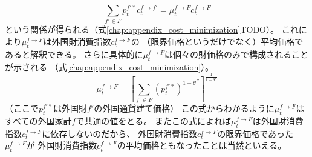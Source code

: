 \begin{equation}
\label{form:chapter3_households_stage1a_foreign_c_f_F_problem_mu_f_F_average_eq}
    \sum_{f'\in F}p_t^{f'*}c_t^{f\to f'}=\mu_t^{f\to F}c_t^{f\to F}
\end{equation}
という関係が得られる（式\eqref{chap:appendix_cost_minimization}TODO）。
これにより\(\mu_t^{f\to F}\)は外国財消費指数\(c_t^{f\to F}\)の
（限界価格というだけでなく）平均価格であると解釈できる。
さらに具体的に\(\mu_t^{f\to F}\)は個々の財価格のみで構成されることが示される
（式\eqref{chap:appendix_cost_minimization}）。
\begin{equation}
\label{form:chapter3_households_stage1a_foreign_c_f_F_problem_mu_f_F_eq}
    \mu_t^{f\to F}=\left[\sum_{f'\in F}(p_t^{f'*})^{1-\theta^F}\right]^{\frac{1}{1-\theta^F}}
\end{equation}
（ここで\(p_t^{f'*}\)は外国財\(f'\)の外国通貨建て価格）
この式からわかるように\(\mu_t^{f\to F}\)はすべての外国家計\(f\)で共通の値をとる。
またこの式によれば\(\mu_t^{f\to F}\)は外国財消費指数\(c_t^{f\to F}\)に依存しないのだから、
外国財消費指数\(c_t^{f\to F}\)の限界価格であった\(\mu_t^{f\to F}\)が
外国財消費指数\(c_t^{f\to F}\)の平均価格ともなったことは当然といえる。

